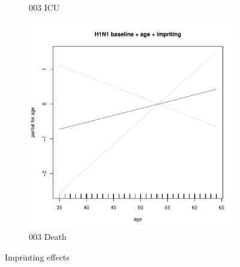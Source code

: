 \documentclass[12pt,twoside]{article}
\begin{document}
\begin{figure}[h]
\begin{subfigure}{.3\linewidth}
                \caption{003 ICU}
        \end{subfigure}
        \begin{subfigure}{.3\linewidth}
                \includegraphics[width=\textwidth, page=2]{003Death_constrained}
                \caption{003 Death}
        \end{subfigure}
        \caption{Imprinting effects}
        \end{figure}
        
    
    
\end{document}
